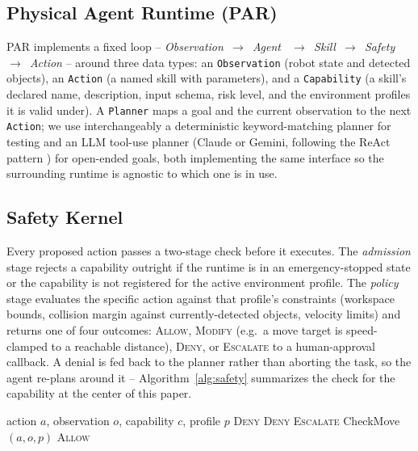 \documentclass{article}
\begin{document}
\subsection{Physical Agent Runtime (PAR)}
PAR implements a fixed loop -- \textit{Observation~$\rightarrow$~Agent~
$\rightarrow$~Skill~$\rightarrow$~Safety~$\rightarrow$~Action} -- around
three data types: an \texttt{Observation} (robot state and detected
objects), an \texttt{Action} (a named skill with parameters), and a
\texttt{Capability} (a skill's declared name, description, input schema,
risk level, and the environment profiles it is valid under). A
\texttt{Planner} maps a goal and the current observation to the next
\texttt{Action}; we use interchangeably a deterministic
keyword-matching planner for testing and an LLM tool-use planner
(Claude or Gemini, following the ReAct pattern \citep{yao2023react}) for
open-ended goals, both implementing the same interface so the surrounding
runtime is agnostic to which one is in use.

\subsection{Safety Kernel}
Every proposed action passes a two-stage check before it executes. The
\textit{admission} stage rejects a capability outright if the runtime is
in an emergency-stopped state or the capability is not registered for the
active environment profile. The \textit{policy} stage evaluates the
specific action against that profile's constraints (workspace bounds,
collision margin against currently-detected objects, velocity limits) and
returns one of four outcomes: \textsc{Allow}, \textsc{Modify} (e.g.\ a move
target is speed-clamped to a reachable distance), \textsc{Deny}, or
\textsc{Escalate} to a human-approval callback. A denial is fed back to the
planner rather than aborting the task, so the agent re-plans around it --
Algorithm~\ref{alg:safety} summarizes the check for the capability at the
center of this paper.

\begin{algorithm}[t]
\caption{Safety check for a proposed action}
\label{alg:safety}
\begin{algorithmic}[1]
\REQUIRE action $a$, observation $o$, capability $c$, profile $p$
  \RETURN \textsc{Deny}
\ENDIF
{}
  \RETURN \textsc{Deny} 
\ENDIF
{}
  \RETURN \textsc{Escalate}
\ENDIF
{}
  \RETURN CheckMove$(a, o, p)$ 
\ENDIF
\RETURN \textsc{Allow}
\end{algorithmic}
\end{algorithm}
\end{document}
